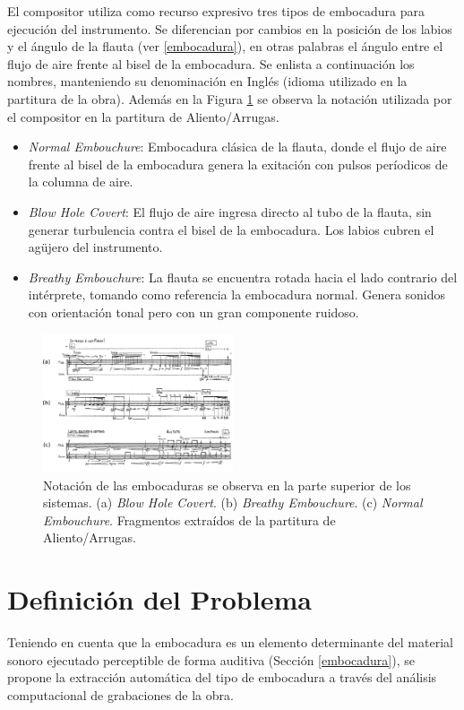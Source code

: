 \documentclass{article}
\begin{document}
El compositor utiliza como recurso expresivo tres tipos de embocadura para ejecución del instrumento. Se diferencian por cambios en la posición de los labios y el ángulo de la flauta (ver \ref{embocadura}), en otras palabras el ángulo entre el flujo de aire frente al bisel de la embocadura. Se enlista a continuación los nombres, manteniendo su denominación en Inglés (idioma utilizado en la partitura de la obra). Además en la Figura \ref{fig:embocaduras} se observa la notación utilizada por el compositor en la partitura de Aliento/Arrugas.

\begin{itemize}
  \item \textit{Normal Embouchure}: Embocadura clásica de la flauta, donde el flujo de aire frente al bisel de la embocadura genera la exitación con pulsos períodicos de la columna de aire. 
  \item \textit{Blow Hole Covert}: El flujo de aire ingresa directo al tubo de la flauta, sin generar turbulencia contra el bisel de la embocadura. Los labios cubren el agüjero del instrumento.
  \item \textit{Breathy Embouchure}: La flauta se encuentra rotada hacia el lado contrario del intérprete, tomando como referencia la embocadura normal. Genera sonidos con orientación tonal pero con un gran componente ruidoso.
\end{itemize}
\medskip

\begin{figure}[H]
\begin{center}
\includegraphics[width=0.5\textwidth]{embocaduras} 
\caption{Notación de las embocaduras se observa en la parte superior de los sistemas. (a) \textit{Blow Hole Covert}. (b) \textit{Breathy Embouchure}. (c) \textit{Normal Embouchure}. Fragmentos extraídos de la partitura de Aliento/Arrugas.}
\label{fig:embocaduras}
\end{center}
\end{figure}

\newpage

\section{Definición del Problema}
\label{problema}
Teniendo en cuenta que la embocadura es un elemento determinante del material sonoro ejecutado perceptible de forma auditiva (Sección \ref{embocadura}), se propone la extracción automática del tipo de embocadura a través del análisis computacional de grabaciones de la obra. 
\end{document}
